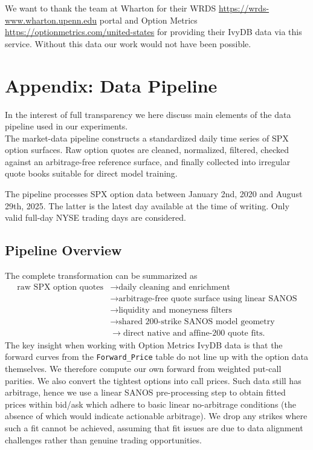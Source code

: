 \documentclass[11pt,a4paper]{article}
\begin{document}
We want to thank the team at Wharton for their WRDS \url{https://wrds-www.wharton.upenn.edu} portal and Option Metrics \url{https://optionmetrics.com/united-states} 
for providing their IvyDB data via this service. Without this data our work would not have been possible.

\appendix
\section{Appendix: Data Pipeline}\label{app:data-pipeline}

In the interest of full transparency we here discuss main elements of the data pipeline used
in our experiments. \\

The market-data pipeline constructs a standardized daily time series of SPX option surfaces. Raw option quotes are cleaned, normalized, filtered, checked against an arbitrage-free reference surface, and finally collected into irregular quote books suitable for direct model training.


The pipeline processes SPX option data between January 2nd, 2020 and August 29th, 2025. The latter
is the latest day available at the time of writing. Only valid full-day NYSE trading days are considered.

\subsection{Pipeline Overview}

The complete transformation can be summarized as
%
\[
\begin{aligned}
\text{raw SPX option quotes}
&\longrightarrow \text{daily cleaning and enrichment} \\
&\longrightarrow \text{arbitrage-free quote surface using linear SANOS} \\
&\longrightarrow \text{liquidity and moneyness filters} \\
&\longrightarrow \text{shared 200-strike SANOS model geometry} \\
&\longrightarrow \text{direct native and affine-200 quote fits}.
\end{aligned}
\]
The key insight when working with Option Metrics IvyDB data is that the forward curves
from the \texttt{Forward\_Price} table do not line up with the option data themselves. We therefore
compute our own forward from weighted put-call parities. We also convert the tightest options into call prices. Such data still has arbitrage, hence we use a linear SANOS pre-processing step to obtain fitted prices within bid/ask which adhere to basic linear no-arbitrage conditions (the absence of which would indicate actionable arbitrage). We drop any strikes where such a fit
cannot be achieved, assuming that fit issues are due to data alignment challenges rather than
genuine trading opportunities.
\end{document}
